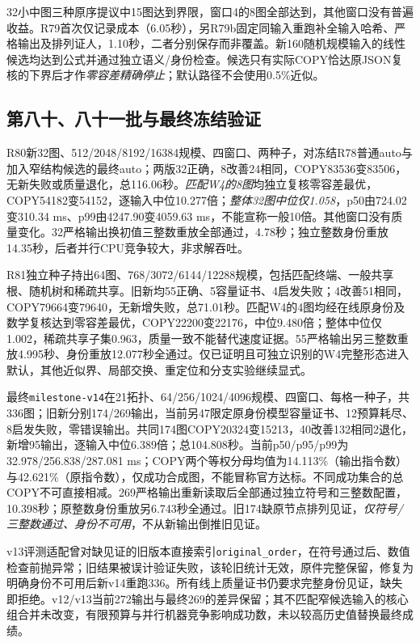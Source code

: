 \documentclass[UTF8,11pt,fontset=fandol]{ctexart}
\begin{document}
32小中图三种原序提议中15图达到界限，窗口4的8图全部达到，其他窗口没有普遍收益。R79首次仅记录成本（6.05秒），另R79b固定同输入重跑补全输入哈希、严格输出及排列证人，1.10秒，二者分别保存而非覆盖。新160随机规模输入的线性候选均达到公式并通过独立语义/身份检查。候选只有实际COPY恰达原JSON复核的下界后才作\emph{零容差精确停止}；默认路径不会使用0.5\%近似。

\subsection{第八十、八十一批与最终冻结验证}
R80新32图、512/2048/8192/16384规模、四窗口、两种子，对冻结R78普通auto与加入窄结构候选的最终auto；两版32正确，8改善24相同，COPY83536变83506，无新失败或质量退化，总116.06秒。\emph{匹配W4的8图}均独立复核零容差最优，COPY54182变54152，逐输入中位10.277倍；\emph{整体32图中位仅1.058}，p50由724.02变310.34 ms、p99由4247.90变4059.63 ms，不能宣称一般10倍。其他窗口没有质量变化。32严格输出换初值三整数重放全部通过，4.78秒；独立整数身份重放14.35秒，后者并行CPU竞争较大，非求解吞吐。

R81独立种子持出64图、768/3072/6144/12288规模，包括匹配终端、一般共享根、随机树和稀疏共享。旧新均55正确、5容量证书、4启发失败；4改善51相同，COPY79664变79640，无新增失败，总71.01秒。匹配W4的4图均经在线原身份及数学复核达到零容差最优，COPY22200变22176，中位9.480倍；整体中位仅1.002，稀疏共享子集0.963，质量一致不能替代速度证据。55严格输出另三整数重放4.995秒、身份重放12.077秒全通过。仅已证明且可独立识别的W4完整形态进入默认，其他近似界、局部交换、重定位和分支实验继续显式。

最终\texttt{milestone-v14}在21拓扑、64/256/1024/4096规模、四窗口、每格一种子，共336图；旧新分别174/269输出，当前另47限定原身份模型容量证书、12预算耗尽、8启发失败，零错误输出。共同174图COPY20324变15213，40改善132相同2退化，新增95输出，逐输入中位6.389倍；总104.808秒。当前p50/p95/p99为32.978/256.838/287.081 ms；COPY两个等权分母均值为14.113\%（输出指令数）与42.621\%（原指令数），仅成功合成图，不能冒称官方达标。不同成功集合的总COPY不可直接相减。269严格输出重新读取后全部通过独立符号和三整数配置，10.398秒；原整数身份重放另6.743秒全通过。旧174缺原节点排列见证，\emph{仅符号/三整数通过、身份不可用}，不从新输出倒推旧见证。

v13评测适配曾对缺见证的旧版本直接索引\texttt{original\_order}，在符号通过后、数值检查前抛异常；旧结果被误计验证失败，该轮旧统计无效，原件完整保留，修复为明确身份不可用后新v14重跑336。所有线上质量证书仍要求完整身份见证，缺失即拒绝。v12/v13当前272输出与最终269的差异保留；其不匹配窄候选输入的核心组合并未改变，有限预算与并行机器竞争影响成功数，未以较高历史值替换最终成绩。
\end{document}
